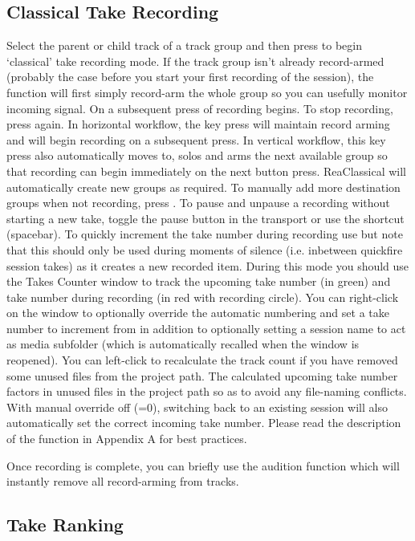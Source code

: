 \documentclass[10pt,american]{article}
\begin{document}
\subsection{Classical Take Recording}

Select the parent or child track of a track group and then press  to
begin `classical' take recording mode. If the track group isn't already
record-armed (probably the case before you start your first recording of the
session), the function will first simply record-arm the whole group so you can
usefully monitor incoming signal. On a subsequent press of  recording
begins. To stop recording, press  again. In horizontal workflow, the
key press will maintain record arming and will begin recording on a subsequent
press. In vertical workflow, this key press also automatically moves to, solos
and arms the next available group so that recording can begin immediately on the
next button press. ReaClassical will automatically create new groups as
required. To manually add more destination groups when not recording, press
\keys{\textbackslash}. To pause and unpause a recording without starting a new
take, toggle the pause button in the transport or use the shortcut
\keys{\ctrl+\space} (spacebar). To quickly increment the take number during
recording use  but note that this should only be used during
moments of silence (i.e. inbetween quickfire session takes) as it creates a new
recorded item. During this mode you should use the Takes Counter window
\keys{\ctrl+\enter} to track the upcoming take number (in green) and take number
during recording (in red with recording circle). You can right-click on the
window to optionally override the automatic numbering and set a take number to
increment from in addition to optionally setting a session name to act as media
subfolder (which is automatically recalled when the window is reopened). You can
left-click to recalculate the track count if you have removed some unused files
from the project path. The calculated upcoming take number factors in unused
files in the project path so as to avoid any file-naming conflicts. With manual
override off (=0), switching back to an existing session will also automatically
set the correct incoming take number. Please read the description of the
function in Appendix A for best practices.

Once recording is complete, you can briefly use the audition function 
which will instantly remove all record-arming from tracks.

\subsection{Take Ranking}
\end{document}

